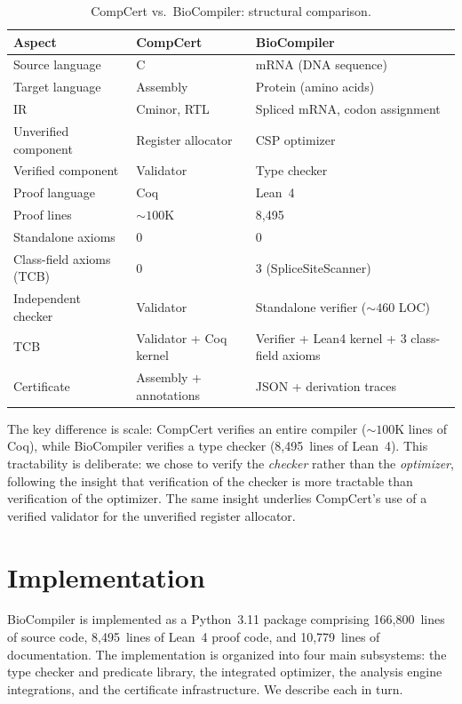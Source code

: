 \documentclass[acmsmall,review,anonymous]{acmart}
\begin{document}
\begin{table}[t]
\centering
\caption{CompCert vs.\ BioCompiler: structural comparison.}
\label{tab:compcert}
\begin{tabular}{lll}
\toprule
\textbf{Aspect} & \textbf{CompCert} & \textbf{BioCompiler} \\
\midrule
Source language & C & mRNA (DNA sequence) \\
Target language & Assembly & Protein (amino acids) \\
IR & Cminor, RTL & Spliced mRNA, codon assignment \\
Unverified component & Register allocator & CSP optimizer \\
Verified component & Validator & Type checker \\
Proof language & Coq & Lean~4 \\
Proof lines & ${\sim}100$K & 8{,}495 \\
Standalone axioms & 0 & 0 \\
Class-field axioms (TCB) & 0 & 3 (SpliceSiteScanner) \\
Independent checker & Validator & Standalone verifier (${\sim}460$ LOC) \\
TCB & Validator + Coq kernel & Verifier + Lean4 kernel + 3 class-field axioms \\
Certificate & Assembly + annotations & JSON + derivation traces \\
\bottomrule
\end{tabular}
\end{table}

The key difference is scale: CompCert verifies an entire compiler
(${\sim}100$K lines of Coq), while BioCompiler verifies a type checker
(8{,}495~lines of Lean~4).
This tractability is deliberate: we chose to verify the \emph{checker}
rather than the \emph{optimizer}, following the insight that
verification of the checker is more tractable than verification of the
optimizer.
The same insight underlies CompCert's use of a verified validator for
the unverified register allocator.




\section{Implementation}\label{sec:impl}

BioCompiler is implemented as a Python~3.11 package comprising
166,800~lines of source code, 8,495~lines of Lean~4 proof code, and
10,779~lines of documentation.  The implementation is organized into four
main subsystems: the type checker and predicate library, the integrated
optimizer, the analysis engine integrations, and the certificate
infrastructure.  We describe each in turn.
\end{document}
